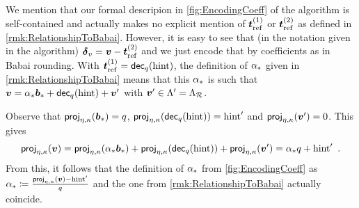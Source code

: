 \begin{remark}
We mention that our formal descripion in \autoref{fig:EncodingCoeff} of the algorithm is self-contained and actually makes no explicit mention of $\boldsymbol{t}_{\mathrm{ref}}^{(1)}$ or $\boldsymbol{t}_{\mathrm{ref}}^{(2)}$ as defined in \autoref{rmk:RelationshipToBabai}. However, it is easy to see that (in the notation given in the algorithm) $\boldsymbol{\delta}_v = \boldsymbol{v}-\boldsymbol{t}_{\mathrm{ref}}^{(2)}$ and we just encode that by coefficients as in Babai rounding. With $\boldsymbol{t}_{\mathrm{ref}}^{(1)}=\mathsf{dec}_{q}(\mathrm{hint})$, the definition of $\alpha_{\ast}$ given in \autoref{rmk:RelationshipToBabai} means that this $\alpha_{\ast}$ is such that $\boldsymbol{v} = \alpha_{\ast}\boldsymbol{b}_{\ast} + \mathsf{dec}_{q}(\mathrm{hint}) + \boldsymbol{v}'$ with $\boldsymbol{v}'\in\Lambda' = \Lambda_{\mathcal{R}}$.

Observe that $\mathsf{proj}_{\eta,\kappa}(\boldsymbol{b}_{\ast}) = q$, $\mathsf{proj}_{\eta,\kappa}(\mathsf{dec}_{q}(\mathrm{hint})) = \mathrm{hint}'$ and $\mathsf{proj}_{\eta,\kappa}(\boldsymbol{v}') = 0$. This gives
\[
\mathsf{proj}_{\eta,\kappa}(\boldsymbol{v}) = \mathsf{proj}_{\eta,\kappa}(\alpha_{\ast}\boldsymbol{b}_{\ast}) + \mathsf{proj}_{\eta,\kappa}(\mathsf{dec}_{q}(\mathrm{hint})) + \mathsf{proj}_{\eta,\kappa}(\boldsymbol{v}') = \alpha_{\ast} q + \mathrm{hint}'\enspace.
\]
From this, it follows that the definition of $\alpha_{\ast}$ from \autoref{fig:EncodingCoeff} as $\alpha_{\ast} \coloneqq \frac{\mathsf{proj}_{\eta,\kappa}(\boldsymbol{v})-\mathrm{hint}'}{q}$ and the one from \autoref{rmk:RelationshipToBabai} actually coincide.
\end{remark}


